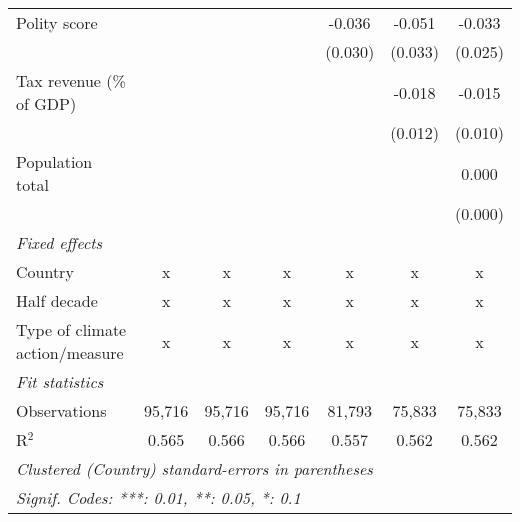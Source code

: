 \begin{tabular}{lcccccc}
   Polity score                                                      &             &               &                & -0.036         & -0.051         & -0.033\\   
                                                                     &             &               &                & (0.030)        & (0.033)        & (0.025)\\   
   Tax revenue (\% of GDP)                                           &             &               &                &                & -0.018         & -0.015\\   
                                                                     &             &               &                &                & (0.012)        & (0.010)\\   
   Population total                                                  &             &               &                &                &                & 0.000\\   
                                                                     &             &               &                &                &                & (0.000)\\   
   \emph{Fixed effects}\\
   Country                                                           & x           & x             & x              & x              & x              & x\\  
   Half decade                                                       & x           & x             & x              & x              & x              & x\\  
   Type of climate action/measure                                    & x           & x             & x              & x              & x              & x\\  
   \midrule \emph{Fit statistics}\\
   Observations                                                      & 95,716      & 95,716        & 95,716         & 81,793         & 75,833         & 75,833\\  
   R$^2$                                                             & 0.565       & 0.566         & 0.566          & 0.557          & 0.562          & 0.562\\  
   \midrule
   \multicolumn{7}{l}{\emph{Clustered (Country) standard-errors in parentheses}}\\
   \multicolumn{7}{l}{\emph{Signif. Codes: ***: 0.01, **: 0.05, *: 0.1}}\\
\end{tabular}
\par\endgroup


